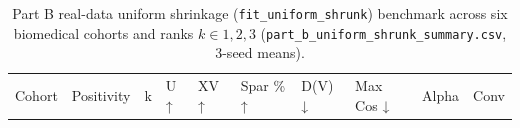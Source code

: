 \documentclass[
  10pt,
  letterpaper,
]{report}
\begin{document}
\begin{longtable}[]{@{}
  >{\raggedright\arraybackslash}p{}
  >{\raggedright\arraybackslash}p{}
  >{\raggedleft\arraybackslash}p{}
  >{\raggedleft\arraybackslash}p{}
  >{\raggedleft\arraybackslash}p{}
  >{\raggedleft\arraybackslash}p{}
  >{\raggedleft\arraybackslash}p{}
  >{\raggedleft\arraybackslash}p{}
  >{\raggedleft\arraybackslash}p{}
  >{\raggedleft\arraybackslash}p{}@{}}
\caption{Part B real-data uniform shrinkage
(\protect\texttt{fit\_uniform\_shrunk}) benchmark across six biomedical
cohorts and ranks \(k \in {1, 2, 3}\)
(\protect\texttt{part\_b\_uniform\_shrunk\_summary.csv}, 3-seed
means).}\label{tbl-v043-part-b}\tabularnewline
\toprule\noalign{}
\begin{minipage}[b]{\linewidth}\raggedright
Cohort
\end{minipage} & \begin{minipage}[b]{\linewidth}\raggedright
Positivity
\end{minipage} & \begin{minipage}[b]{\linewidth}\raggedleft
k
\end{minipage} & \begin{minipage}[b]{\linewidth}\raggedleft
U ↑
\end{minipage} & \begin{minipage}[b]{\linewidth}\raggedleft
XV ↑
\end{minipage} & \begin{minipage}[b]{\linewidth}\raggedleft
Spar \% ↑
\end{minipage} & \begin{minipage}[b]{\linewidth}\raggedleft
D(V) ↓
\end{minipage} & \begin{minipage}[b]{\linewidth}\raggedleft
Max Cos ↓
\end{minipage} & \begin{minipage}[b]{\linewidth}\raggedleft
Alpha
\end{minipage} & \begin{minipage}[b]{\linewidth}\raggedleft
Conv
\end{minipage} \\

\end{longtable}
\end{document}
